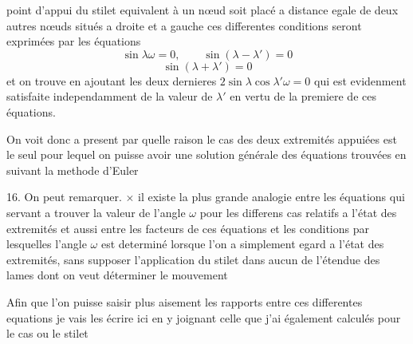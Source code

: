 \documentclass[11pt,a4paper]{article}
\begin{document}
point d'appui du stilet equivalent à un nœud soit placé a distance egale de
deux autres nœuds situés a droite et a gauche ces differentes conditions
seront exprimées par les équations
\[ \sin\lambda\omega=0, \qquad \sin(\lambda-\lambda')=0 \]
\[ \sin(\lambda+\lambda')=0 \]
et on  trouve en ajoutant les deux dernieres
$2\sin\lambda\cos\lambda'\omega=0$ qui est evidenment satisfaite  independamment
de la valeur de $\lambda'$ en vertu de la premiere de ces équations.

On voit donc a present par quelle raison le cas des deux extremités appuiées
est le seul pour lequel on puisse avoir une solution générale  des
équations trouvées en suivant la methode d'Euler \struck{\ill{}}


16. On  peut remarquer.  $\times$ il existe la plus
grande analogie entre les équations qui  servant a
trouver \struck{\ill{}} la valeur de l'angle $\omega$ pour  les
differens cas relatifs a l'état des extremités et aussi entre les facteurs de
ces équations et les conditions par lesquelles l'angle $\omega$ est determiné
 lorsque l'on a simplement egard a l'état des extremités, sans
supposer l'application du stilet dans aucun  de l'étendue des
lames dont on veut déterminer le mouvement

Afin que l'on puisse saisir plus aisement les rapports entre ces differentes
 equations je vais les  écrire ici en y
joignant celle que j'ai également calculés pour le cas ou le stilet
\end{document}
